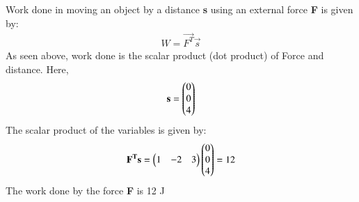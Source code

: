 Work done in moving an object by a distance \textbf{s} using an external force \textbf{F} is given by:
\begin{align}
W = \vec{F^T}\vec{s}
\end{align}
As seen above, work done is the scalar product (dot product) of Force and distance.  Here, 
\begin{align}
\mathbf{s}=\begin{pmatrix}0\\0\\4\end{pmatrix}   
\end{align}
The scalar product of the variables is given by:
\begin{align}
\mathbf{F^T}\mathbf{s} = \begin{pmatrix}1 & -2 & 3\end{pmatrix} \begin{pmatrix}0\\0\\4\end{pmatrix} = 12
\end{align}
The work done by the force \textbf{F} is 12 J
